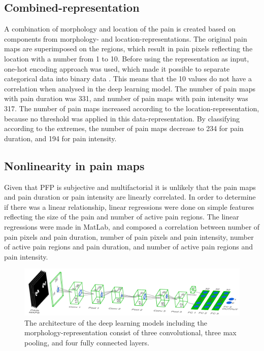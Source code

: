 \subsection*{\textbf{Combined-representation}} 
A combination of morphology and location of the pain is created based on components from morphology- and location-representations. The original pain maps are superimposed on the regions, which result in pain pixels reflecting the location with a number from 1 to 10. Before using the representation as input, one-hot encoding approach was used, which made it possible to separate categorical data into binary data \citep{Harris2012}. This means that the 10 values do not have a correlation when analysed in the deep learning model. The number of pain maps with pain duration was 331, and number of pain maps with pain intensity was 317. The number of pain maps increased according to the location-representation, because no threshold was applied in this data-representation. By classifying according to the extremes, the number of pain maps decrease to 234 for pain duration, and 194 for pain intensity.

\subsection*{\textbf{Nonlinearity in pain maps}} 
Given that PFP is subjective and multifactorial it is unlikely that the pain maps and pain duration or pain intensity are linearly correlated. In order to determine if there was a linear relationship, linear regressions were done on simple features reflecting the size of the pain and number of active pain regions. The linear regressions were made in MatLab, and composed a correlation between number of pain pixels and pain duration, number of pain pixels and pain intensity, number of active pain regions and pain duration, and number of active pain regions and pain intensity.

\begin{figure} [t!]
\centering
\includegraphics[width=1\textwidth]{Figures/models}
\caption{The architecture of the deep learning models including the morphology-representation consist of three convolutional, three max pooling, and four fully connected layers.}
\label{fig:models}
\end{figure}

